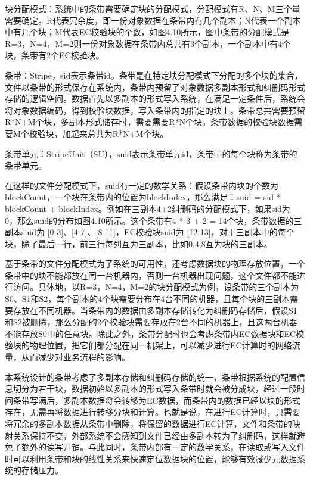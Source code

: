 块分配模式：系统中的条带需要确定块的分配模式，分配模式有R、N、M三个量需要确定。R代表冗余度，即一份对象数据在条带内有几个副本；N代表一个副本中有几个块；M代表EC校验块的个数，如图4.10所示，图中条带的分配模式是R=3，N=4，M=2则一份对象数据在条带内总共有3个副本，一个副本中有4个块，条带有2个EC校验块。

条带：Stripe，sid表示条带id。条带是在特定块分配模式下分配的多个块的集合，文件以条带的形式保存在系统内，条带内预留了对象数据多副本形式和纠删码形式存储的逻辑空间。数据首先以多副本的形式写入系统，在满足一定条件后，系统会将对象数据编码，得到校验块数据，写入条带内的指定的块上。条带总共需要预留R*N+M个块，多副本形式储存时，需要需要R*N个块，条带数据的校验块数据需要M个校验块，加起来总共为R*N+M个块。

条带单元：StripeUnit（SU），suid表示条带单元id，条带中的每个块称为条带的条带单元。

在这样的文件分配模式下，suid有一定的数学关系：假设条带内块的个数为blockCount，一个块在条带内的位置为blockIndex，那么满足：suid = sid * blockCount + blockIndex。例如在三副本4+2纠删码的分配模式下，如果sid为 0，那么suid的分布如图4.10所示。这个条带有4 * 3 + 2 = 14个块，条带数据的三副本suid为 [0-3]、[4-7]、[8-11]，EC校验块suid为 [12-13]，对于三副本中的每个块，除了最后一行，前三行每列互为三副本，比如0,4,8互为块的三副本。

基于条带的文件分配模式为了系统的可用性，还考虑数据块的物理存放位置，一个条带中的块不能都放在同一台机器内，否则一台机器出现问题，这个文件都不能进行访问。具体地，以R=3，N=4，M=2的块分配模式为例，设条带的三个副本为S0、S1和S2，每个副本的4个块需要分布在4台不同的机器，且每个块的三副本需要存放在不同机器。当条带内的数据由多副本存储转化为纠删码存储后，假设S1和S2被删除，那么分配的2个校验块需要存放在2台不同的机器上，且这两台机器不能存放S0中的任意块。除此之外，条带分配时也会考虑条带内EC数据块和EC校验块的物理位置，把它们都分配在同一机架上，可以减少进行EC计算时的网络流量，从而减少对业务流程的影响。

本系统设计的条带考虑了多副本存储和纠删码存储的统一，条带根据系统的配置信息切分为若干块，数据初始以多副本的形式写入条带时就会被分成块，经过一段时间条带写满后，多副本数据将会转移为EC数据，而条带内的数据已经以块的形式存在，无需再将数据进行转移分块和计算。也就是说，在进行EC计算时，只需要将冗余的多副本数据从条带中删除，将保留的数据进行EC计算，文件和条带的映射关系保持不变，外部系统不会感知到文件已经由多副本转为了纠删码，这样就避免了额外的读写开销。与此同时，条带内部有一定的数学关系，在读取或写入文件时可以利用条带和块的线性关系来快速定位数据块的位置，能够有效减少元数据系统的存储压力。

